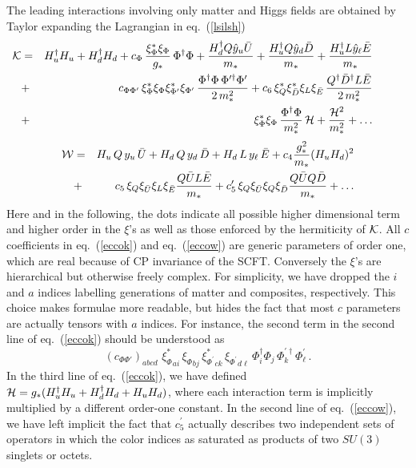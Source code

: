 \documentclass[a4paper,12pt]{article}
\newcommand{\bea}{\begin{eqnarray}}
\newcommand{\eea}{\end{eqnarray}}
\newcommand{\beq}{\begin{equation}}
\newcommand{\eeq}{\end{equation}}
\def\eq#1{eq.~(\ref{#1})}
\def\eq#1{eq.~(\ref{#1})}
\def\mst{m_*}
\begin{document}
The leading interactions involving only matter and Higgs fields are obtained by Taylor expanding the Lagrangian in \eq{lsilsh} 
\bea
\!\!\!\!\!\!\!\!\!\!\!\!\!\!\!\!{\cal K} &=& H_u^\dagger H_u +  H_d^\dagger H_d + c_\Phi\, \frac{\xi_\Phi^* \xi_\Phi}{g_*} \, \Phi^\dagger \Phi +
\frac{H_d^\dagger Q  {\hat y}_u {\bar U} }{\mst} + \frac{H_u^\dagger Q  {\hat y}_d {\bar D} }{\mst}  + \frac{H_u^\dagger L  {\hat y}_\ell {\bar E}}{\mst} 
\nonumber \\ \!\!\!\!\!\!\!\!\!\!\!\!\!\!\!\!&+&\!\!\!
c_{\Phi\Phi'} \, \xi_\Phi^* \xi_\Phi \xi_{\Phi^\prime}^* \xi_{\Phi^\prime} \, \frac{\Phi^\dagger  \Phi \, \Phi^{\prime\dagger}\Phi^\prime}{2\,\mst^2} +
 {c}_6 \, \xi_{Q}^* \xi_{{\bar D}}^* \xi_{L} \xi_{{\bar E}} \, \frac{Q^\dagger {\bar D}^{\dagger} L {\bar E}}{2\,\mst^2}
\nonumber \\ \!\!\!\!\!\!\!\!\!\!\!\!\!\!\!\!&+&\!\!\!
 \xi_\Phi^* \xi_\Phi \, \frac{\Phi^\dagger  \Phi}{\mst^2}\, {\cal H} +
 \frac{{\cal H}^2}{\mst^2}
+ \dots
\label{eccok}
\eea
\bea
{\cal W} &= &H_u \, Q \, y_u \,{\bar U}  + H_d \, Q  \, y_d \, {\bar D}  + H_d \, L  \, y_\ell \, {\bar E}  +c_4 \frac{g_*^2}{\mst} (H_u H_d)^2
\nonumber \\ &+&\!\!\!
 c_5 \, \xi_{Q} \xi_{{\bar U}} \xi_{L}  \xi_{{\bar E}} \frac{Q {\bar U} L  {\bar E}}{\mst} 
+  c_5^\prime \, \xi_{Q} \xi_{{\bar U}} \xi_{Q}  \xi_{{\bar D}} \frac{Q {\bar U} Q {\bar D}}{\mst} + \dots
\label{eccow}
\eea
Here and in the following, the dots indicate all possible higher dimensional term and higher order in the $\xi$'s as well as those enforced by the hermiticity of ${\cal K}$. All  $c$ coefficients in \eq{eccok} and \eq{eccow} are generic parameters of order one, which are  real because of  CP invariance of the SCFT. Conversely the   $\xi$'s are hierarchical  but otherwise freely complex. For simplicity, we have dropped the $i$ and $a$ indices labelling  generations of matter and composites, respectively. This choice makes formulae more readable, but hides the fact that
 most $c$ parameters are actually tensors
with $a$ indices. For instance, the second term in the second line of \eq{eccok} should be understood as
\beq
{(c_{\Phi\Phi'})}_{abcd}\, \, {\xi_\Phi^*}_{ai} \,{\xi_\Phi}_{bj} \,{\xi_{\Phi^\prime}^*}_{ck}\, {\xi_{\Phi^\prime}}_{d\ell} \, \Phi^\dagger_i  \Phi_j \, \Phi^{\prime\dagger}_k\Phi^\prime_\ell \, .
\eeq
In the third line of \eq{eccok}, we have defined ${\cal H} = g_*(H_u^\dagger H_u + H_d^\dagger H_d + H_u H_d)$, where each interaction term is implicitly multiplied by a different order-one constant. In the second line of \eq{eccow}, we have left implicit the fact that $c_5^\prime$ actually describes two independent sets of operators in which the color indices as saturated as products of two $SU(3)$ singlets or octets. 
\end{document}
